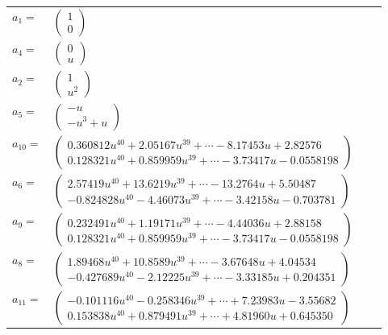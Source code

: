 \documentclass[1p]{elsarticle_modified}
\theoremstyle{definition}
\begin{document}
\begin{tabular}{m{7pt} m{180pt} m{7pt} m{180pt} }
\flushright $a_{1}=$&$\begin{pmatrix}1\\0\end{pmatrix}$ \\
\flushright $a_{4}=$&$\begin{pmatrix}0\\u\end{pmatrix}$ \\
\flushright $a_{2}=$&$\begin{pmatrix}1\\u^2\end{pmatrix}$ \\
\flushright $a_{5}=$&$\begin{pmatrix}- u\\- u^3+u\end{pmatrix}$ \\
\flushright $a_{10}=$&$\begin{pmatrix}0.360812 u^{40}+2.05167 u^{39}+\cdots-8.17453 u+2.82576\\0.128321 u^{40}+0.859959 u^{39}+\cdots-3.73417 u-0.0558198\end{pmatrix}$ \\
\flushright $a_{6}=$&$\begin{pmatrix}2.57419 u^{40}+13.6219 u^{39}+\cdots-13.2764 u+5.50487\\-0.824828 u^{40}-4.46073 u^{39}+\cdots-3.42158 u-0.703781\end{pmatrix}$ \\
\flushright $a_{9}=$&$\begin{pmatrix}0.232491 u^{40}+1.19171 u^{39}+\cdots-4.44036 u+2.88158\\0.128321 u^{40}+0.859959 u^{39}+\cdots-3.73417 u-0.0558198\end{pmatrix}$ \\
\flushright $a_{8}=$&$\begin{pmatrix}1.89468 u^{40}+10.8589 u^{39}+\cdots-3.67648 u+4.04534\\-0.427689 u^{40}-2.12225 u^{39}+\cdots-3.33185 u+0.204351\end{pmatrix}$ \\
\flushright $a_{11}=$&$\begin{pmatrix}-0.101116 u^{40}-0.258346 u^{39}+\cdots+7.23983 u-3.55682\\0.153838 u^{40}+0.879491 u^{39}+\cdots+4.81960 u+0.645350\end{pmatrix}$ \\

\end{tabular}
\end{document}
